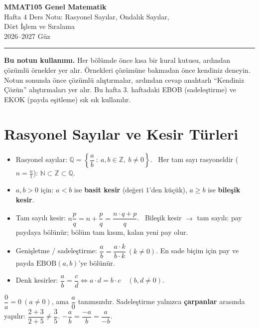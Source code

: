 \documentclass[11pt,a4paper]{article}
\begin{document}
\begin{minipage}[c]{\textwidth}
{\LARGE\bfseries\color{anamavi} MMAT105 Genel Matematik}\\[4pt]
{\large Hafta 4 Ders Notu: Rasyonel Sayılar, Ondalık Sayılar,\\ Dört İşlem ve Sıralama}\\[6pt]
{\small 2026--2027 Güz}
\end{minipage}

\vspace{4pt}\noindent\textcolor{anamavi}{\rule{\textwidth}{1pt}}

\textbf{Bu notun kullanımı.} Her bölümde önce kısa bir kural kutusu, ardından çözümlü örnekler yer alır. Örnekleri çözümüne bakmadan önce kendiniz deneyin. Notun sonunda önce çözümlü alıştırmalar, ardından cevap anahtarlı ``Kendiniz Çözün'' alıştırmaları yer alır. Bu hafta 3. haftadaki EBOB (sadeleştirme) ve EKOK (payda eşitleme) sık sık kullanılır.

\section{Rasyonel Sayılar ve Kesir Türleri}

\begin{kural}[Tanımlar]
\begin{itemize}[leftmargin=*,itemsep=1pt]
\item Rasyonel sayılar: \(\mathbb{Q}=\left\{\dfrac{a}{b}\ :\ a,b\in\mathbb{Z},\ b\neq 0\right\}\). \ Her tam sayı rasyoneldir (\(n=\frac{n}{1}\)): \(\mathbb{N}\subset\mathbb{Z}\subset\mathbb{Q}\).
\item \(a,b>0\) için: \(a<b\) ise \textbf{basit kesir} (değeri \(1\)'den küçük), \(a\ge b\) ise \textbf{bileşik kesir}.
\item Tam sayılı kesir: \(n\dfrac{p}{q}=n+\dfrac{p}{q}=\dfrac{n\cdot q+p}{q}\). \ Bileşik kesir \(\to\) tam sayılı: pay paydaya bölünür; bölüm tam kısım, kalan yeni pay olur.
\item Genişletme / sadeleştirme: \(\dfrac{a}{b}=\dfrac{a\cdot k}{b\cdot k}\ (k\neq 0)\). En sade biçim için pay ve payda \(\text{EBOB}(a,b)\)'ye bölünür.
\item Denk kesirler: \(\dfrac{a}{b}=\dfrac{c}{d}\iff a\cdot d=b\cdot c\quad(b,d\neq 0)\).
\end{itemize}
\end{kural}

\begin{dikkat}
\(\dfrac{0}{a}=0\ (a\neq 0)\), ama \(\dfrac{a}{0}\) tanımsızdır. \quad Sadeleştirme yalnızca \textbf{çarpanlar} arasında yapılır: \(\dfrac{2+3}{2+5}\neq\dfrac{3}{5}\). \quad \(-\dfrac{a}{b}=\dfrac{-a}{b}=\dfrac{a}{-b}\).
\end{dikkat}
\end{document}
